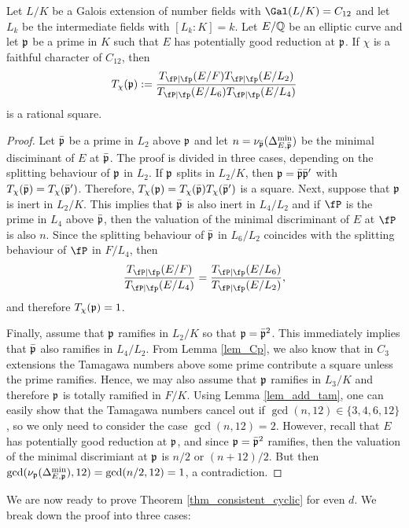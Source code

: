 \begin{lemma}
    Let $L/K$ be a Galois extension of number fields with $\Gal(L/K)=C_{12}$ and let $L_k$ be the intermediate fields with $[L_k:K]=k$. Let $E/\mathbb{Q}$ be an elliptic curve and let $\mathfrak{p}$ be a prime in $K$ such that $E$ has potentially good reduction at $\mathfrak{p}$. If $\chi$ is a faithful character of $C_{12}$, then $$T_\chi(\pp):=\frac{T_{\fP\mid\fp}(E/F)T_{\fP\mid\fp}(E/L_2)}{T_{\fP\mid\fp}(E/L_6)T_{\fP\mid\fp}(E/L_4)}$$ is a rational square.
\end{lemma}
\begin{proof}
    Let $\bar{\mathfrak{p}}$ be a prime in $L_2$ above $\mathfrak{p}$ and let $n=\nu_{\bar{\mathfrak{p}}}(\Delta_{E,\bar{\mathfrak{p}}}^{\min})$ be the minimal disciminant of $E$ at $\bar{\mathfrak{p}}$. The proof is divided in three cases, depending on the splitting behaviour of $\mathfrak{p}$ in $L_2$. If $\mathfrak{p}$ splits in $L_2/K$, then $\mathfrak{p}=\bar{\mathfrak{p}}\bar{\mathfrak{p}}'$ with $T_\chi(\bar{\mathfrak{p}})=T_\chi(\bar{\mathfrak{p}}')$. Therefore, $T_\chi(\mathfrak{p})=T_\chi(\bar{\mathfrak{p}})T_\chi(\bar{\mathfrak{p}}')$ is a square. Next, suppose that $\mathfrak{p}$ is inert in $L_2/K$. This implies that $\bar{\mathfrak{p}}$ is also inert in $L_4/L_2$ and if $\fP$ is the prime in $L_4$ above $\bar{\mathfrak{p}}$, then the valuation of the minimal discriminant of $E$ at $\fP$ is also $n$. Since the splitting behaviour of $\bar{\mathfrak{p}}$ in $L_6/L_2$ coincides with the splitting behaviour of $\fP$ in $F/L_4$, then 
    $$\frac{T_{\fP\mid\fp}(E/F)}{T_{\fP\mid\fp}(E/L_4)}=\frac{T_{\fP\mid\fp}(E/L_6)}{T_{\fP\mid\fp}(E/L_2)},$$
    and therefore $T_\chi(\mathfrak{p})=1$.

    Finally, assume that $\mathfrak{p}$ ramifies in $L_2/K$ so that $\mathfrak{p}=\bar{\mathfrak{p}}^2$. This immediately implies that $\bar{\mathfrak{p}}$ also ramifies in $L_4/L_2$. From Lemma \ref{lem_Cp}, we also know that in $C_3$ extensions the Tamagawa numbers above some prime contribute a square unless the prime ramifies. Hence, we may also assume that $\mathfrak{p}$ ramifies in $L_3/K$ and therefore $\mathfrak{p}$ is totally ramified in $F/K$. Using Lemma \ref{lem_add_tam}, one can easily show that the Tamagawa numbers cancel out if $\gcd(n,12)\in\{3,4,6,12\}$, so we only need to consider the case $\gcd(n,12)=2$. However, recall that $E$ has potentially good reduction at $\mathfrak{p}$, and since $\mathfrak{p}=\bar{\mathfrak{p}}^2$ ramifies, then the valuation of the minimal discrimiant at $\mathfrak{p}$ is $n/2$ or $(n+12)/2$. But then $\gcd(\nu_{\mathfrak{p}}(\Delta_{E,\mathfrak{p}}^{\min}),12)=\gcd(n/2,12)=1$, a contradiction.
\end{proof}


We are now ready to prove Theorem \ref{thm_consistent_cyclic} for even $d$. We break down the proof into three cases:

